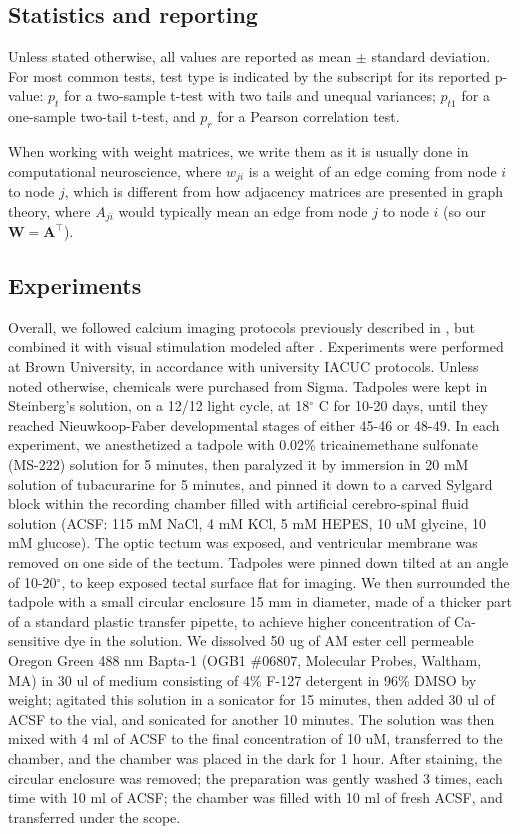 \documentclass{article}
\begin{document}
\subsection*{Statistics and reporting}

Unless stated otherwise, all values are reported as mean $\pm$ standard deviation. For most common tests, test type is indicated by the subscript for its reported p-value: $p_t$ for a two-sample t-test with two tails and unequal variances; $p_{t1}$ for a one-sample two-tail t-test, and $p_r$ for a Pearson correlation test.

When working with weight matrices, we write them as it is usually done in computational neuroscience, where $w_{ji}$ is a weight of an edge coming from node $i$ to node $j$, which is different from how adjacency matrices are presented in graph theory, where $A_{ji}$ would typically mean an edge from node $j$ to node $i$ (so our $\mathbf{W} = \mathbf{A}^\top$).

\subsection*{Experiments}

Overall, we followed calcium imaging protocols previously described in \citep{xu2011, truszkowski2017}, but combined it with visual stimulation modeled after \citep{khakhalin2014}. Experiments were performed at Brown University, in accordance with university IACUC protocols. Unless noted otherwise, chemicals were purchased from Sigma. Tadpoles were kept in Steinberg’s solution, on a 12/12 light cycle, at 18$^\circ$ C for 10-20 days, until they reached Nieuwkoop-Faber developmental stages of either 45-46 or 48-49. In each experiment, we anesthetized a tadpole with 0.02\% tricainemethane sulfonate (MS-222) solution for 5 minutes, then paralyzed it by immersion in 20 mM solution of tubacurarine for 5 minutes, and pinned it down to a carved Sylgard block within the recording chamber filled with artificial cerebro-spinal fluid solution (ACSF: 115 mM NaCl, 4 mM KCl, 5 mM HEPES, 10 uM glycine, 10 mM glucose). The optic tectum was exposed, and ventricular membrane was removed on one side of the tectum. Tadpoles were pinned down tilted at an angle of 10-20$^\circ$, to keep exposed tectal surface flat for imaging. We then surrounded the tadpole with a small circular enclosure 15 mm in diameter, made of a thicker part of a standard plastic transfer pipette, to achieve higher concentration of Ca-sensitive dye in the solution. We dissolved 50 ug of AM ester cell permeable Oregon Green 488 nm Bapta-1 (OGB1 $\#$06807, Molecular Probes, Waltham, MA) in 30 ul of medium consisting of 4\% F-127 detergent in 96\% DMSO by weight; agitated this solution in a sonicator for 15 minutes, then added 30 ul of ACSF to the vial, and sonicated for another 10 minutes. The solution was then mixed with 4 ml of ACSF to the final concentration of 10 uM, transferred to the chamber, and the chamber was placed in the dark for 1 hour. After staining, the circular enclosure was removed; the preparation was gently washed 3 times, each time with 10 ml of ACSF; the chamber was filled with 10 ml of fresh ACSF, and transferred under the scope.
\end{document}
